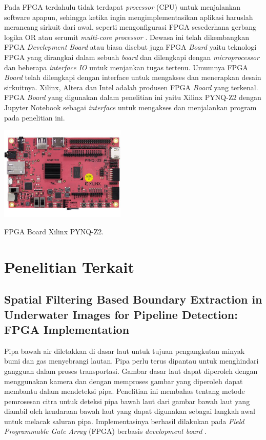 Pada FPGA terdahulu tidak terdapat \textit{processor} (CPU) untuk menjalankan software apapun, sehingga ketika ingin mengimplementasikan aplikasi haruslah merancang sirkuit dari awal, seperti mengonfigurasi FPGA sesederhana gerbang logika OR atau serumit \textit{multi-core processor} . Dewasa ini telah dikembangkan FPGA \textit{Develepment Board} atau biasa disebut juga FPGA \textit{Board} yaitu teknologi FPGA yang dirangkai dalam sebuah \textit{board} dan dilengkapi dengan \textit{microprocessor} dan beberapa \textit{interface} \textit{IO} untuk menjankan tugas tertenu. Umumnya FPGA \textit{Board} telah dilengkapi dengan interface untuk mengakses dan menerapkan desain sirkuitnya. Xilinx, Altera dan Intel adalah produsen FPGA \textit{Board} yang terkenal. FPGA \textit{Board} yang digunakan dalam penelitian ini yaitu Xilinx PYNQ-Z2 dengan Jupyter Notebook sebagai \textit{interface} untuk mengakses dan menjalankan program pada penelitian ini.

\begin{afigure}
    \includegraphics[width=6cm, center]{images/pynq-z2.jpeg}
    \caption{FPGA Board Xilinx PYNQ-Z2.}
    \label{fig:pynq-z2}
\end{afigure}


\section{Penelitian Terkait}
\subsection{Spatial Filtering Based Boundary Extraction in Underwater Images for Pipeline Detection: FPGA Implementation}
Pipa bawah air diletakkan di dasar laut untuk tujuan pengangkutan minyak bumi dan gas menyebrangi lautan. Pipa perlu terus dipantau untuk menghindari gangguan dalam proses transportasi. Gambar dasar laut dapat diperoleh dengan menggunakan kamera dan dengan memproses gambar yang diperoleh dapat membantu dalam mendeteksi pipa. Penelitian ini membahas tentang metode pemrosesan citra untuk deteksi pipa bawah laut dari gambar bawah laut yang diambil oleh kendaraan bawah laut yang dapat digunakan sebagai langkah awal untuk melacak saluran pipa. Implementasinya berhasil dilakukan pada \textit{Field Programmable Gate Array} (FPGA) berbasis \textit{development board} .

